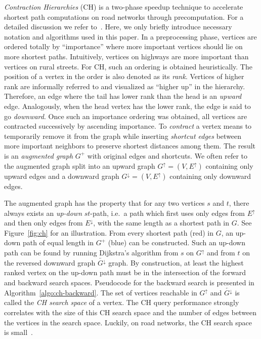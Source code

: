 \documentclass[manuscript,review]{acmart}
\newcommand*{\gchu}{G^{\uparrow}}
\newcommand*{\gchd}{G^{\downarrow}}
\newcommand*{\rgchd}{\overleftarrow{G^{\downarrow}}}
\newcommand*{\echu}{E^{\uparrow}}
\newcommand*{\echd}{E^{\downarrow}}
\begin{document}
\emph{Contraction Hierarchies} (CH) is a two-phase speedup technique to accelerate shortest path computations on road networks through precomputation.
For a detailed discussion we refer to~\cite{gssv-erlrn-12}.
Here, we only briefly introduce necessary notation and algorithms used in this paper.
In a preprocessing phase, vertices are ordered totally by ``importance'' where more important vertices should lie on more shortest paths.
Intuitively, vertices on highways are more important than vertices on rural streets.
For CH, such an ordering is obtained heuristically.
The position of a vertex in the order is also denoted as its \emph{rank}.
Vertices of higher rank are informally referred to and visualized as ``higher up'' in the hierarchy.
Therefore, an edge where the tail has lower rank than the head is an \emph{upward} edge.
Analogously, when the head vertex has the lower rank, the edge is said to go \emph{downward}.
Once such an importance ordering was obtained, all vertices are contracted successively by ascending importance.
To \emph{contract} a vertex means to temporarily remove it from the graph while inserting \emph{shortcut edges} between more important neighbors to preserve shortest distances among them.
The result is an \emph{augmented graph} $G^+$ with original edges and shortcuts.
We often refer to the augmented graph split into an upward graph $\gchu = (V, \echu)$ containing only upward edges and a downward graph $\gchd = (V, \echu)$ containing only downward edges.

The augmented graph has the property that for any two vertices $s$ and $t$, there always exists an \emph{up-down} $st$-path, i.e.\ a path  which first uses only edges from $\echu$ and then only edges from $\echd$, with the same length as a shortest path in $G$.
See Figure~\ref{fig:ch} for an illustration.
From every shortest path (red) in $G$, an up-down path of equal length in $G^+$ (blue) can be constructed.
Such an up-down path can be found by running Dijkstra's algorithm from $s$ on $\gchu$ and from $t$ on the reversed downward graph $\rgchd$ graph.
By construction, at least the highest ranked vertex on the up-down path must be in the intersection of the forward and backward search spaces.
Pseudocode for the backward search is presented in Algorithm~\ref{algo:ch-backward}.
The set of vertices reachable in $\gchu$ and $\rgchd$ is called the \emph{CH search space} of a vertex.
The CH query performance strongly correlates with the size of this CH search space and the number of edges between the vertices in the search space.
Luckily, on road networks, the CH search space is small~\cite{gssv-erlrn-12,dgpw-crprn-13}.
\end{document}
